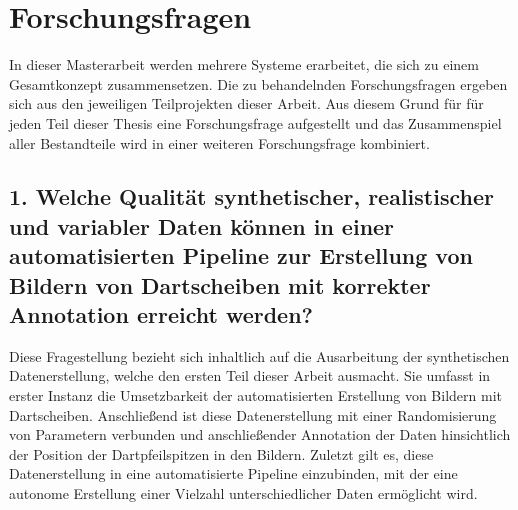 


\section{Forschungsfragen}
\label{sec:forschungsfragen}

In dieser Masterarbeit werden mehrere Systeme erarbeitet, die sich zu einem Gesamtkonzept zusammensetzen. Die zu behandelnden Forschungsfragen ergeben sich aus den jeweiligen Teilprojekten dieser Arbeit. Aus diesem Grund für für jeden Teil dieser Thesis eine Forschungsfrage aufgestellt und das Zusammenspiel aller Bestandteile wird in einer weiteren Forschungsfrage kombiniert.

\subsection*{1. Welche Qualität synthetischer, realistischer und variabler Daten können in einer automatisierten Pipeline zur Erstellung von Bildern von Dartscheiben mit korrekter Annotation erreicht werden?}

Diese Fragestellung bezieht sich inhaltlich auf die Ausarbeitung der synthetischen Datenerstellung, welche den ersten Teil dieser Arbeit ausmacht. Sie umfasst in erster Instanz die Umsetzbarkeit der automatisierten Erstellung von Bildern mit Dartscheiben. Anschließend ist diese Datenerstellung mit einer Randomisierung von Parametern verbunden und anschließender Annotation der Daten hinsichtlich der Position der Dartpfeilspitzen in den Bildern. Zuletzt gilt es, diese Datenerstellung in eine automatisierte Pipeline einzubinden, mit der eine autonome Erstellung einer Vielzahl unterschiedlicher Daten ermöglicht wird.

